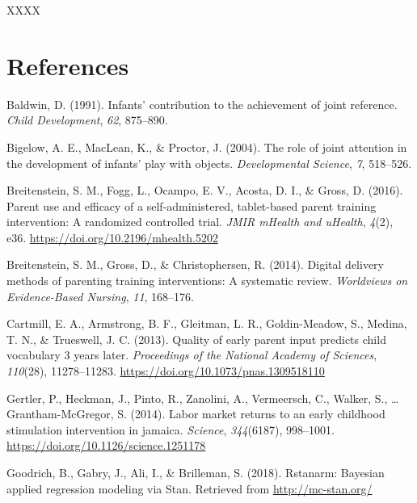 \documentclass[
  english,
  man]{apa6}
\begin{document}
XXXX

\newpage

\hypertarget{references}{%
\section{References}\label{references}}

\begingroup
\setlength{\parindent}{-0.5in}
\setlength{\leftskip}{0.5in}

\hypertarget{refs}{}
\leavevmode\hypertarget{ref-Baldwin1991}{}%
Baldwin, D. (1991). Infants' contribution to the achievement of joint reference. \emph{Child Development}, \emph{62}, 875--890.

\leavevmode\hypertarget{ref-Bigelow2004}{}%
Bigelow, A. E., MacLean, K., \& Proctor, J. (2004). The role of joint attention in the development of infants' play with objects. \emph{Developmental Science}, \emph{7}, 518--526.

\leavevmode\hypertarget{ref-Breitenstein2016}{}%
Breitenstein, S. M., Fogg, L., Ocampo, E. V., Acosta, D. I., \& Gross, D. (2016). Parent use and efficacy of a self-administered, tablet-based parent training intervention: A randomized controlled trial. \emph{JMIR mHealth and uHealth}, \emph{4}(2), e36. \url{https://doi.org/10.2196/mhealth.5202}

\leavevmode\hypertarget{ref-Breitenstein2014}{}%
Breitenstein, S. M., Gross, D., \& Christophersen, R. (2014). Digital delivery methods of parenting training interventions: A systematic review. \emph{Worldviews on Evidence-Based Nursing}, \emph{11}, 168--176.

\leavevmode\hypertarget{ref-Cartmill2013}{}%
Cartmill, E. A., Armstrong, B. F., Gleitman, L. R., Goldin-Meadow, S., Medina, T. N., \& Trueswell, J. C. (2013). Quality of early parent input predicts child vocabulary 3 years later. \emph{Proceedings of the National Academy of Sciences}, \emph{110}(28), 11278--11283. \url{https://doi.org/10.1073/pnas.1309518110}

\leavevmode\hypertarget{ref-Jamaica2014}{}%
Gertler, P., Heckman, J., Pinto, R., Zanolini, A., Vermeersch, C., Walker, S., \ldots{} Grantham-McGregor, S. (2014). Labor market returns to an early childhood stimulation intervention in jamaica. \emph{Science}, \emph{344}(6187), 998--1001. \url{https://doi.org/10.1126/science.1251178}

\leavevmode\hypertarget{ref-rstanarm}{}%
Goodrich, B., Gabry, J., Ali, I., \& Brilleman, S. (2018). Rstanarm: Bayesian applied regression modeling via Stan. Retrieved from \url{http://mc-stan.org/}
\end{document}
